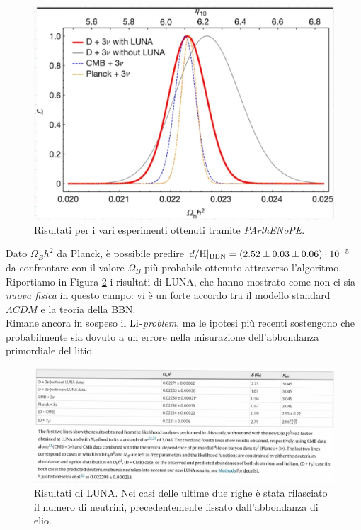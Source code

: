 \begin{figure}[!h]
    \centering
    \includegraphics[scale=0.2]{Immagini/0315_luna.png}
    \caption{Risultati per i vari esperimenti ottenuti tramite \textit{PArthENoPE}.}
    \label{0315_parthenope}
\end{figure}
\noindent Dato $\Omega_B h^2$ da Planck, è possibile predire $d/\ce{H}|_\text{BBN} = (2.52\pm0.03\pm0.06)\cdot\ord{-5}$ da confrontare con il valore $\Omega_B$ più probabile ottenuto attraverso l'algoritmo. Riportiamo in Figura \ref{0315_risultati} i risultati di LUNA, che hanno mostrato come non ci sia \textit{nuova fisica} in questo campo: vi è un forte accordo tra il modello standard $\Lambda CDM$ e la teoria della BBN.\\
Rimane ancora in sospeso il $\ce{Li}$-\textit{problem}, ma le ipotesi più recenti sostengono che probabilmente sia dovuto a un errore nella misurazione dell'abbondanza primordiale del litio.



\begin{figure}[h]
    \centering
    \includegraphics[scale=0.26]{Immagini/0315_risultati.png}
    \caption{Risultati di LUNA. Nei casi delle ultime due righe è stata rilasciato il numero di neutrini, precedentemente fissato dall'abbondanza di elio.}
    \label{0315_risultati}
\end{figure}
\newpage